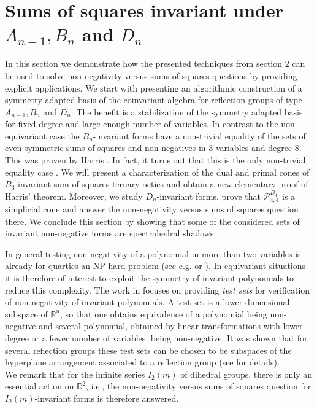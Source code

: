 \documentclass[11pt,a4paper]{amsart}
\numberwithin{equation}{section}
\theoremstyle{definition}
\newcommand{\R}{\mathbb{R}}
\numberwithin{thm}{section}
\theoremstyle{break}
\numberwithin{subcase}{case}
\begin{document}
\section{Sums of squares invariant under $A_{n-1}, B_n$ and $D_n$}
In this section we demonstrate how the presented techniques from section $2$ can be used to solve non-negativity versus sums of squares questions by providing explicit applications. We start with presenting an algorithmic construction of a symmetry adapted basis of the coinvariant algebra for reflection groups of type $A_{n-1},B_n$ and $D_n$. The benefit is a stabilization of the symmetry adapted basis for fixed degree and large enough number of variables. In contrast to the non-equivariant case the $B_n$-invariant forms have a non-trivial equality of the sets of even symmetric sums of squares and non-negatives in $3$ variables and degree $8$. This was proven by Harris \cite{harris1999real}. In fact, it turns out that this is the only non-trivial equality case \cite{goel2017analogue}. We will present a characterization of the dual and primal cones of $B_3$-invariant sum of squares ternary octics and obtain a new elementary proof of Harris' theorem. Moreover, we study $D_n$-invariant forms, prove that $\mathcal{P}_{4,4}^{D_4}$ is a simplicial cone and answer the non-negativity versus sums of squares question there. We conclude this section by showing that some of the considered sets of invariant non-negative forms are spectrahedral shadows. 

In general testing non-negativity of a polynomial in more than two variables is already for quartics an NP-hard problem (see e.g. \cite{blum1998complexity} or \cite{murty1985some}). In equivariant situations it is therefore of interest to exploit the symmetry of invariant polynomials to reduce this complexity. The work in \cite{harris1999real, timofte2003positivity,riener2012degree,riener2016symmetric,acevedo2016test,friedl2018reflection,moustrou2019symmetric} focuses on providing \emph{test sets} for verification of non-negativity of invariant polynomials. A test set is  a lower dimensional subspace of $\R^n$, so that one obtains equivalence of a polynomial being non-negative and several polynomial, obtained by linear transformations with lower degree or a fewer number of variables, being non-negative. It was shown that for several reflection groups these test sets can be chosen to be subspaces of the hyperplane arrangement associated to a reflection group (see \cite{friedl2018reflection,acevedo2016test} for details). \\
We remark that for the infinite series $I_2(m)$ of dihedral groups, there is only an essential action on $\R^2$, i.e., the non-negativity versus sums of squares question for $I_2(m)$-invariant forms is therefore answered.
\end{document}
